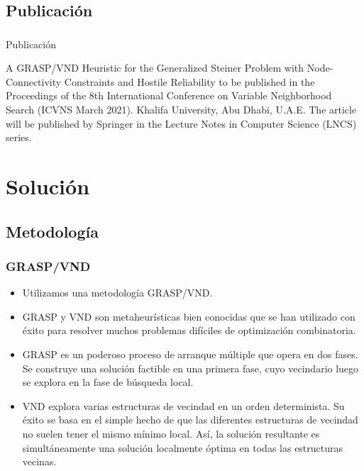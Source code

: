 \subsection{Publicación}
\begin{frame}\frametitle{}
\begin{block}{Publicación}
	\begin{enumerate}
	\end{enumerate}
\end{block}
\end{frame}

\section{Solución}
\subsection{Metodología}
\begin{frame}\frametitle{GRASP/VND}
\begin{block}{}
\begin{small}
\begin{itemize}
 \item Utilizamos una metodología GRASP/VND.
 \item GRASP y VND son metaheurísticas bien conocidas que se han utilizado con éxito para resolver muchos problemas difíciles de optimización combinatoria.
 \item GRASP es un poderoso proceso de arranque múltiple que opera en dos fases. Se construye una solución factible en una primera fase, cuyo vecindario luego se explora en la fase de búsqueda local.
 \item VND explora varias estructuras de vecindad en un orden determinista. Su éxito se basa en el simple hecho de que las diferentes estructuras de vecindad no suelen tener el mismo mínimo local. Así, la solución resultante es simultáneamente una solución localmente óptima en todas las estructuras vecinas.
\end{itemize} 
\end{small}
\end{block}
\end{frame}

